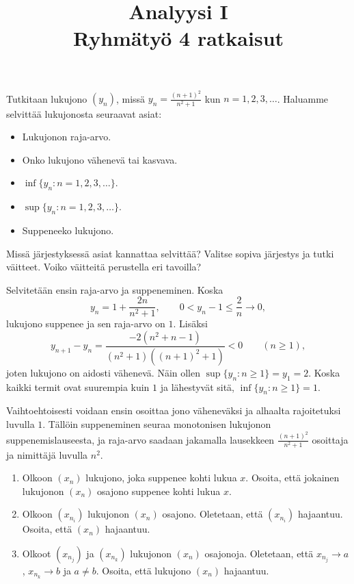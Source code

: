 \documentclass[11pt,a4paper]{amsart}
\title{Analyysi I\\Ryhmätyö 4 ratkaisut}
\author{}
\date{}
\begin{document}

\begin{exercise}
  Tutkitaan lukujono \((y_n)\), missä \(y_n = \frac{(n+1)^2}{n^2+1}\)
  kun \(n = 1, 2, 3, \ldots\). Haluamme selvittää lukujonosta seuraavat asiat:
  \begin{itemize}[nosep]
    \item Lukujonon raja-arvo.
    \item Onko lukujono vähenevä tai kasvava.
    \item \(\inf\{y_n : n = 1, 2, 3, \ldots\}\).
    \item \(\sup\{y_n : n = 1, 2, 3, \ldots\}\).
    \item Suppeneeko lukujono.
  \end{itemize}
  Missä järjestyksessä asiat kannattaa selvittää? Valitse sopiva järjestys ja
  tutki väitteet. Voiko väitteitä perustella eri tavoilla?
\end{exercise}

\begin{solution}
  Selvitetään ensin raja-arvo ja suppeneminen. Koska
  \[
    y_n = 1 + \frac{2n}{n^2+1},
    \qquad 0 < y_n-1 \leq \frac{2}{n} \to 0,
  \]
  lukujono suppenee ja sen raja-arvo on \(1\). Lisäksi
  \[
    y_{n+1}-y_n
    = \frac{-2(n^2+n-1)}{(n^2+1)((n+1)^2+1)} < 0
    \qquad(n\geq 1),
  \]
  joten lukujono on aidosti vähenevä. Näin ollen
  \(\sup\{y_n:n\geq1\}=y_1=2\). Koska kaikki termit ovat suurempia
  kuin \(1\) ja lähestyvät sitä, \(\inf\{y_n:n\geq1\}=1\).

  Vaihtoehtoisesti voidaan ensin osoittaa jono väheneväksi ja alhaalta
  rajoitetuksi luvulla \(1\). Tällöin suppeneminen seuraa monotonisen
  lukujonon suppenemislauseesta, ja raja-arvo saadaan jakamalla
  lausekkeen \(\frac{(n+1)^2}{n^2+1}\) osoittaja ja nimittäjä luvulla \(n^2\).
\end{solution}

\begin{exercise}
  \leavevmode\par
  \begin{enumerate}[label=(\arabic*), nosep]
    \item Olkoon \((x_n)\) lukujono, joka suppenee kohti lukua \(x\).
      Osoita, että jokainen lukujonon \((x_n)\) osajono suppenee kohti
      lukua \(x\).
    \item Olkoon \((x_{n_i})\) lukujonon \((x_n)\) osajono. Oletetaan,
      että \((x_{n_i})\) hajaantuu. Osoita, että \((x_n)\) hajaantuu.
    \item Olkoot \((x_{n_j})\) ja \((x_{n_k})\) lukujonon \((x_n)\)
      osajonoja. Oletetaan, että \(x_{n_j} \to a\), \(x_{n_k} \to b\)
      ja \(a \neq b\). Osoita, että lukujono \((x_n)\) hajaantuu.
  \end{enumerate}
\end{exercise}
\end{document}

